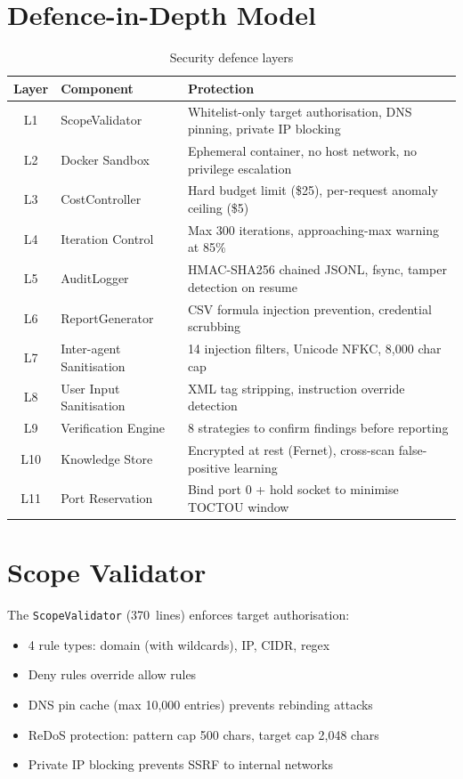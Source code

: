 \documentclass[12pt,a4paper]{report}
\begin{document}
\section{Defence-in-Depth Model}
\begin{table}[H]
\centering
\caption{Security defence layers}
\label{tab:security}
\begin{tabularx}{\textwidth}{clX}
\toprule
\textbf{Layer} & \textbf{Component} & \textbf{Protection} \\
\midrule
L1 & ScopeValidator     & Whitelist-only target authorisation, DNS pinning, private IP blocking \\
L2 & Docker Sandbox     & Ephemeral container, no host network, no privilege escalation \\
L3 & CostController     & Hard budget limit (\$25), per-request anomaly ceiling (\$5) \\
L4 & Iteration Control  & Max 300 iterations, approaching-max warning at 85\% \\
L5 & AuditLogger        & HMAC-SHA256 chained JSONL, fsync, tamper detection on resume \\
L6 & ReportGenerator    & CSV formula injection prevention, credential scrubbing \\
L7 & Inter-agent Sanitisation & 14 injection filters, Unicode NFKC, 8,000 char cap \\
L8 & User Input Sanitisation & XML tag stripping, instruction override detection \\
L9 & Verification Engine & 8 strategies to confirm findings before reporting \\
L10 & Knowledge Store   & Encrypted at rest (Fernet), cross-scan false-positive learning \\
L11 & Port Reservation  & Bind port 0 + hold socket to minimise TOCTOU window \\
\bottomrule
\end{tabularx}
\end{table}

\section{Scope Validator}
The \texttt{ScopeValidator} (370~lines) enforces target authorisation:
\begin{itemize}[noitemsep]
  \item 4 rule types: domain (with wildcards), IP, CIDR, regex
  \item Deny rules override allow rules
  \item DNS pin cache (max 10,000 entries) prevents rebinding attacks
  \item ReDoS protection: pattern cap 500 chars, target cap 2,048 chars
  \item Private IP blocking prevents SSRF to internal networks
\end{itemize}
\end{document}
